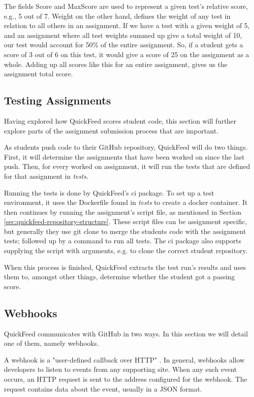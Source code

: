 The fields Score and MaxScore are used to represent a given test's relative score, e.g., 5 out of 7.
Weight on the other hand, defines the weight of any test in relation to all others in an assignment.
If we have a test with a given weight of 5, and an assignment where all test weights summed up give a total weight of 10, our test would account for 50\% of the entire assignment.
So, if a student gets a score of 3 out of 6 on this test, it would give a score of 25 on the assignment as a whole.
Adding up all scores like this for an entire assignment, gives us the assignment total score.

\subsection{Testing Assignments}

Having explored how QuickFeed scores student code, this section will further explore parts of the assignment submission process that are important.

As students push code to their GitHub repository, QuickFeed will do two things.
First, it will determine the assignments that have been worked on since the last push.
Then, for every worked on assignment, it will run the tests that are defined for that assignment in \textit{tests}.

Running the tests is done by QuickFeed's ci package.
To set up a test environment, it uses the Dockerfile found in \textit{tests} to create a docker container.
It then continues by running the assignment's script file, as mentioned in Section \ref{sec:quickfeed-repository-structure}.
These script files can be assignment specific, but generally they use git clone to merge the students code with the assignment tests; followed up by a command to run all tests.
The ci package also supports supplying the script with arguments, e.g. to clone the correct student repository.

When this process is finished, QuickFeed extracts the test run's results and uses them to, amongst other things, determine whether the student got a passing score.

\subsection{Webhooks}
\label{sec:webhooks}

QuickFeed communicates with GitHub in two ways.
In this section we will detail one of them, namely webhooks.

A webhook is a "user-defined callback over HTTP" \cite{webhook}. 
In general, webhooks allow developers to listen to events from any supporting site.
When any such event occurs, an HTTP request is sent to the address configured for the webhook.
The request contains data about the event, usually in a JSON format.

